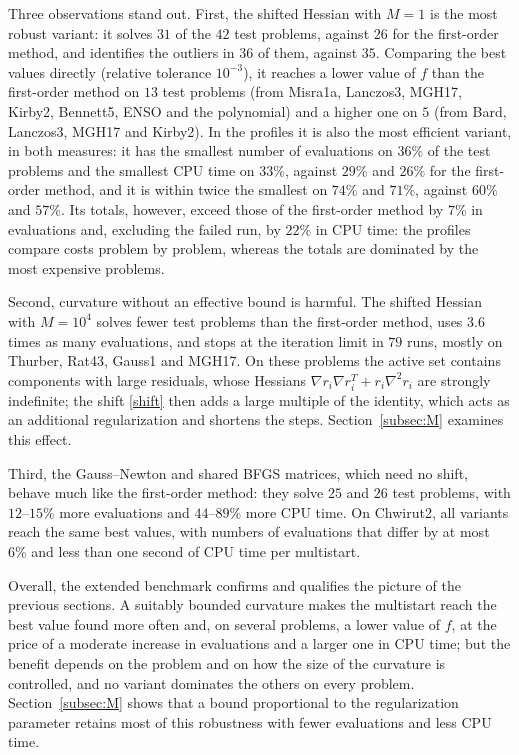 \documentclass[11pt]{article}
\begin{document}
Three observations stand out. First, the shifted Hessian with $M=1$ is the most
robust variant: it solves $31$ of the $42$ test problems, against $26$ for the
first-order method, and identifies the outliers in $36$ of them, against $35$.
Comparing the best values directly (relative tolerance $10^{-3}$), it reaches
a lower value of $f$ than the first-order method on $13$ test problems (from
Misra1a, Lanczos3, MGH17, Kirby2, Bennett5, ENSO and the polynomial) and a
higher one on $5$ (from Bard, Lanczos3, MGH17 and Kirby2). In the profiles it
is also the most efficient variant, in both measures: it has the smallest
number of evaluations on $36\%$ of the test problems and the smallest CPU time
on $33\%$, against $29\%$ and $26\%$ for the first-order method, and it is
within twice the smallest on $74\%$ and $71\%$, against $60\%$ and $57\%$.
Its totals, however, exceed those of the first-order method by $7\%$ in
evaluations and, excluding the failed run, by $22\%$ in CPU time: the profiles
compare costs problem by problem, whereas the totals are dominated by the most
expensive problems.

Second, curvature without an effective bound is harmful. The shifted Hessian
with $M=10^4$ solves fewer test problems than the first-order method, uses
$3.6$ times as many evaluations, and stops at the iteration limit in $79$ runs,
mostly on Thurber, Rat43, Gauss1 and MGH17. On these problems the active set
contains components with large residuals, whose Hessians
$\nabla r_i\nabla r_i^T + r_i\nabla^2 r_i$ are strongly indefinite; the shift
\eqref{shift} then adds a large multiple of the identity, which acts as an
additional regularization and shortens the steps. Section~\ref{subsec:M}
examines this effect.

Third, the Gauss--Newton and shared BFGS matrices, which need no shift, behave
much like the first-order method: they solve $25$ and $26$ test problems, with
$12$--$15\%$ more evaluations and $44$--$89\%$ more CPU time. On Chwirut2, all
variants reach the same best values, with numbers of evaluations that differ by
at most $6\%$ and less than one second of CPU time per multistart.

Overall, the extended benchmark confirms and qualifies the picture of the
previous sections. A suitably bounded curvature makes the multistart reach the
best value found more often and, on several problems, a lower value of $f$, at
the price of a moderate increase in evaluations and a larger one in CPU time;
but the benefit depends on the problem and on how the size of the curvature is
controlled, and no variant dominates the others on every problem.
Section~\ref{subsec:M} shows that a bound proportional to the regularization
parameter retains most of this robustness with fewer evaluations and less CPU
time.
\end{document}
